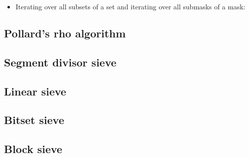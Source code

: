 \begin{itemize}
  \item Iterating over all subsets of a set and iterating over all submasks of a mask:
\end{itemize}

\subsection{Pollard's rho algorithm}

\subsection{Segment divisor sieve}

\subsection{Linear sieve}

\subsection{Bitset sieve}

\subsection{Block sieve}
